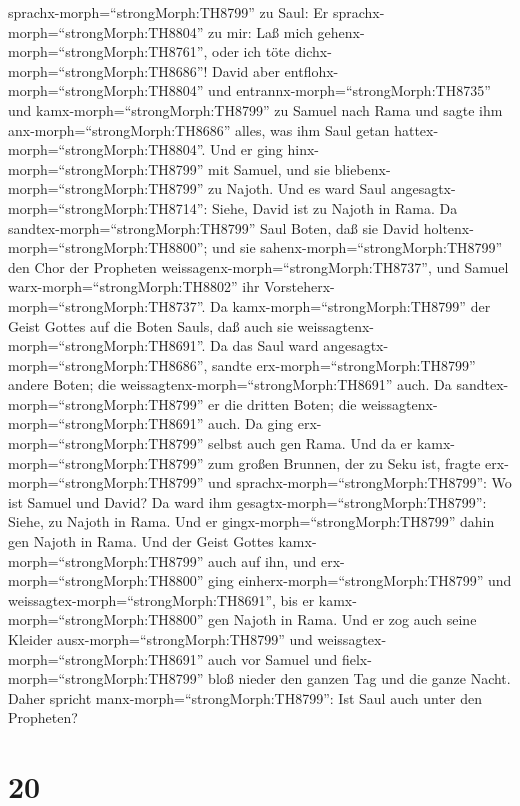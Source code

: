 sprachx-morph=``strongMorph:TH8799'' zu Saul: Er
sprachx-morph=``strongMorph:TH8804'' zu mir: Laß mich
gehenx-morph=``strongMorph:TH8761'', oder ich töte
dichx-morph=``strongMorph:TH8686''!  David aber
entflohx-morph=``strongMorph:TH8804'' und
entrannx-morph=``strongMorph:TH8735'' und
kamx-morph=``strongMorph:TH8799'' zu Samuel nach Rama und sagte ihm
anx-morph=``strongMorph:TH8686'' alles, was ihm Saul getan
hattex-morph=``strongMorph:TH8804''. Und er ging
hinx-morph=``strongMorph:TH8799'' mit Samuel, und sie
bliebenx-morph=``strongMorph:TH8799'' zu Najoth.  Und es
ward Saul angesagtx-morph=``strongMorph:TH8714'': Siehe, David ist zu
Najoth in Rama.  Da sandtex-morph=``strongMorph:TH8799''
Saul Boten, daß sie David holtenx-morph=``strongMorph:TH8800''; und sie
sahenx-morph=``strongMorph:TH8799'' den Chor der Propheten
weissagenx-morph=``strongMorph:TH8737'', und Samuel
warx-morph=``strongMorph:TH8802'' ihr
Vorsteherx-morph=``strongMorph:TH8737''. Da
kamx-morph=``strongMorph:TH8799'' der Geist Gottes auf die Boten Sauls,
daß auch sie weissagtenx-morph=``strongMorph:TH8691''.  Da
das Saul ward angesagtx-morph=``strongMorph:TH8686'', sandte
erx-morph=``strongMorph:TH8799'' andere Boten; die
weissagtenx-morph=``strongMorph:TH8691'' auch. Da
sandtex-morph=``strongMorph:TH8799'' er die dritten Boten; die
weissagtenx-morph=``strongMorph:TH8691'' auch.  Da ging
erx-morph=``strongMorph:TH8799'' selbst auch gen Rama. Und da er
kamx-morph=``strongMorph:TH8799'' zum großen Brunnen, der zu Seku ist,
fragte erx-morph=``strongMorph:TH8799'' und
sprachx-morph=``strongMorph:TH8799'': Wo ist Samuel und David? Da ward
ihm gesagtx-morph=``strongMorph:TH8799'': Siehe, zu Najoth in Rama.
 Und er gingx-morph=``strongMorph:TH8799'' dahin gen Najoth
in Rama. Und der Geist Gottes kamx-morph=``strongMorph:TH8799'' auch auf
ihn, und erx-morph=``strongMorph:TH8800'' ging
einherx-morph=``strongMorph:TH8799'' und
weissagtex-morph=``strongMorph:TH8691'', bis er
kamx-morph=``strongMorph:TH8800'' gen Najoth in Rama.  Und
er zog auch seine Kleider ausx-morph=``strongMorph:TH8799'' und
weissagtex-morph=``strongMorph:TH8691'' auch vor Samuel und
fielx-morph=``strongMorph:TH8799'' bloß nieder den ganzen Tag und die
ganze Nacht. Daher spricht manx-morph=``strongMorph:TH8799'': Ist Saul
auch unter den Propheten?

\hypertarget{section-19}{%
\section{20}\label{section-19}}

